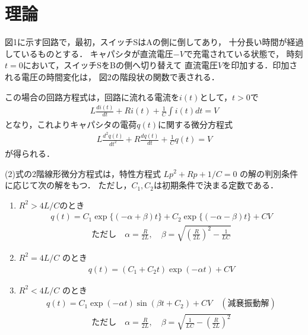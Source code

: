 
\section{理論}

図1に示す回路で，最初，スイッチSはAの側に倒してあり，
十分長い時間が経過しているものとする．
キャパシタが直流電圧$-V$で充電されている状態で，
時刻$t=0$において，スイッチSをBの側へ切り替えて
直流電圧$V$を印加する．印加される電圧の時間変化は，
図2の階段状の関数で表される．

この場合の回路方程式は，回路に流れる電流を$i(t)$として，$t>0$で
\begin{align}
    L \frac{d i(t)}{d t}+R i(t)+\frac{1}{C} \int i(t) d t=V
\end{align}
となり，これよりキャパシタの電荷$q(t)$に関する微分方程式
\begin{align}
    L \frac{d^2 q(t)}{d t^2}+R \frac{d q(t)}{d t}+\frac{1}{C} q(t)=V
\end{align}
が得られる．

(2)式の2階線形微分方程式は，特性方程式 $L p^2+R p+1 / C=0$ 
の解の判別条件に応じて次の解をもつ．
ただし，$C_1, C_2$は初期条件で決まる定数である．

\begin{enumerate}
    \item $R^2>4L/C$のとき
        \begin{align}
            q(t)=C_1 \exp \{(-\alpha+\beta) t\}+C_2 \exp \{(-\alpha-\beta) t\}+C V
        \end{align}
        \begin{align*}
            ただし \quad \alpha=\frac{R}{2 L}, \quad \beta=\sqrt{\left(\frac{R}{2 L}\right)^2-\frac{1}{L C}}
        \end{align*}

    \item $R^2=4 L / C$ のとき
        \begin{align}
            q(t)=\left(C_1+C_2 t\right) \exp (-\alpha t)+C V
        \end{align}

    \item $R^2<4 L / C$ のとき
        \begin{align}
            q(t)=C_1 \exp (-\alpha t) \sin \left(\beta t+C_2\right)+C V\quad(減㐮振動解)
        \end{align}
        \begin{align*}
            ただし \quad \alpha=\frac{R}{2 L}, \quad \beta=\sqrt{\frac{1}{L C}-\left(\frac{R}{2 L}\right)^2}
        \end{align*}
\end{enumerate}


